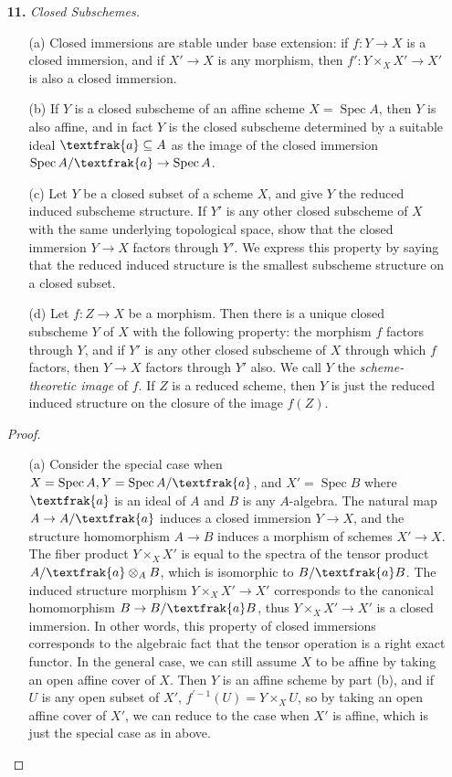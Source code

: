 \documentclass{article}
\newcommand{\goth}[1]{\textfrak{#1}}
\DeclareMathOperator{\spec}{Spec}
\begin{document}
\begin{enumerate} [label=\textbf{\arabic*.}, leftmargin=0em]
\item[\textbf{11.}] \textit{Closed Subschemes.}
\begin{itemize} [leftmargin=0cm]
    \item[(a)] Closed immersions are stable under base extension: if $f : Y \to X$ is a closed immersion, and if $X' \to X$ is any morphism, then $f' : Y \times_X X' \to X'$ is also a closed immersion.

    \item[(b)] If $Y$ is a closed subscheme of an affine scheme $X = \spec{A}$, then $Y$ is also affine, and in fact $Y$ is the closed subscheme determined by a suitable ideal $\goth{a} \subseteq A$ as the image of the closed immersion $\spec{A / \goth{a}} \to \spec{A}$.

    \item[(c)] Let $Y$ be a closed subset of a scheme $X$, and give $Y$ the reduced induced subscheme structure. If $Y'$ is any other closed subscheme of $X$ with the same underlying topological space, show that the closed immersion $Y \to X$ factors through $Y'$. We express this property by saying that the reduced induced structure is the smallest subscheme structure on a closed subset.

    \item[(d)] Let $f : Z \to X$ be a morphism. Then there is a unique closed subscheme $Y$ of $X$ with the following property: the morphism $f$ factors through $Y$, and if $Y'$ is any other closed subscheme of $X$ through which $f$ factors, then $Y \to X$ factors through $Y'$ also. We call $Y$ the \textit{scheme-theoretic image} of $f$. If $Z$ is a reduced scheme, then $Y$ is just the reduced induced structure on the closure of the image $f(Z)$.
\end{itemize}

\begin{proof} $ $ \vspace{0pt}
   \begin{itemize} [leftmargin=0cm]
    \item[(a)] Consider the special case when $X = \spec{A}, Y = \spec{A / \goth{a}}$, and $X' = \spec{B}$ where $\goth{a}$ is an ideal of $A$ and $B$ is any $A$-algebra. The natural map $A \to A / \goth{a}$ induces a closed immersion $Y \to X$, and the structure homomorphism $A \to B$ induces a morphism of schemes $X' \to X$. The fiber product $Y \times_X X'$ is equal to the spectra of the tensor product $A / \goth{a} \otimes_A B$, which is isomorphic to $B / \goth{a}B$. The induced structure morphism $Y \times_X X' \to X'$ corresponds to the canonical homomorphism $B \to B / \goth{a} B$, thus $Y \times_X X' \to X'$ is a closed immersion. In other words, this property of closed immersions corresponds to the algebraic fact that the tensor operation is a right exact functor. In the general case, we can still assume $X$ to be affine by taking an open affine cover of $X$. Then $Y$ is an affine scheme by part (b), and if $U$ is any open subset of $X'$, $f^{'-1}(U) = Y \times_X U$, so by taking an open affine cover of $X'$, we can reduce to the case when $X'$ is affine, which is just the special case as in above.


\end{itemize}
\end{proof}
\end{enumerate}
\end{document}
